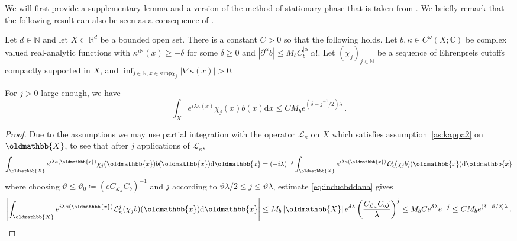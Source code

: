 \documentclass[
	fontsize=11pt, 
	twoside=false, 
	abstract=true, 
	a4paper,
]{scrartcl}
\newcommand{\RR}{\mathbb{R}}
\newcommand{\CC}{\mathbb{C}}
\newcommand{\dd}{\mathrm{d}}
\newcommand{\abs}[1]{\left\lvert#1\right\rvert}
\newcommand{\del}{\partial}
\newcommand{\supp}{\mathrm{supp}}
\newcommand{\mf}[1]{\oldmathbb{#1}}
\begin{document}
We will first provide a supplementary lemma and a version of the method of stationary phase that is taken from \cite[\S~19.3]{MR4436039}. We briefly remark that the following result can also be seen as a consequence of \cite[Thm.~7.7.1]{hoermander1}. 
\begin{lemma}\label{lem:cptpartint2}
	Let $d\in \mathbb{N}$ and let $X\subset \RR^d$ be a bounded open set. There is a constant $C>0$ so that the following holds. Let $b,\kappa \in C^\omega(X; \CC)$ be complex valued real-analytic functions with $\kappa^{i\RR}(x) \geq -\delta$ for some $\delta \geq 0$ and $\abs{\del^\alpha b} \leq M_b C_b^{\abs{\alpha}}\alpha!$. 
	Let $(\chi_{j})_{j\in\mathbb{N}}$ be a sequence of Ehrenpreis cutoffs compactly supported in $X$, and $\inf_{j\in\mathbb{N}, x\in\supp \chi_j} \abs{\nabla \kappa(x)} > 0$. 
	
	For $j>0$ large enough, we have
	\[
		\int_{X} e^{i\lambda \kappa(x)} \chi_{j}(x) b(x)\dd x \leq CM_be^{(\delta-j^{-1}/2)\lambda}\,.
	\]
\end{lemma}
\begin{proof}
	Due to the assumptions we may use partial integration with the operator $\mathcal{L}_{\kappa}$ on $X$ which satisfies assumption~\ref{as:kappa2} on $\mf{X}$, %
	to see that after $j$ applications of $\mathcal{L}_\kappa$,
	\[
		\int_{\mf{X}} e^{i\lambda \kappa(\mf{x})} \chi_j(\mf{x}) b(\mf{x})\dd \mf{x} = (-i\lambda)^{-j}\int_{\mf{X}} e^{i\lambda \kappa(\mf{x})} \mathcal{L}_\kappa^j(\chi_j b)(\mf{x})\dd \mf{x}
	\]
	where choosing $\vartheta \leq \vartheta_0 \coloneqq (e C_{\mathcal{L}_\kappa}C_b)^{-1}$ and $j$ according to $\vartheta\lambda/2\leq j\leq \vartheta\lambda$, estimate \cref{eq:inducbddana} gives	
	\[
		\abs{\int_{\mf{X}} e^{i\lambda \kappa(\mf{x})} \mathcal{L}^j_\kappa(\chi_j b)(\mf{x})\dd \mf{x}} \leq M_b\abs{\mf{X}} e^{\delta\lambda} \left(\frac{C_{\mathcal{L}_\kappa}C_b j}{\lambda}\right)^j \leq M_b C e^{\delta\lambda} e^{-j} \leq C M_b e^{(\delta-\vartheta/2)\lambda}\,.
	\]
\end{proof}
\end{document}

